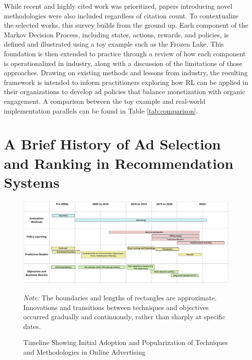 \documentclass[final]{anthology-ch}         %
\begin{document}
While recent and highly cited work was prioritized, papers introducing novel methodologies were also included regardless of citation count. To contextualize the selected works, this survey builds from the ground up. Each component of the Markov Decision Process, including states, actions, rewards, and policies, is defined and illustrated using a toy example such as the Frozen Lake. This foundation is then extended to practice through a review of how each component is operationalized in industry, along with a discussion of the limitations of those approaches. Drawing on existing methods and lessons from industry, the resulting framework is intended to inform practitioners exploring how RL can be applied in their organizations to develop ad policies that balance monetization with organic engagement. A comparison between the toy example and real-world implementation parallels can be found in Table \ref{tab:comparison}.



\section{A Brief History of Ad Selection and Ranking in Recommendation Systems}

\begin{figure}[ht]
    \centering
    \includegraphics[width=\textwidth]{history_timeline_figure.png}
    \caption{Timeline Showing Initial Adoption and Popularization of Techniques and Methodologies in Online Advertising}
    \label{fig:ad_timeline}
    \vspace{0.2cm} %
    \begin{flushleft}
        \footnotesize{\textit{Note:} The boundaries and lengths of rectangles are approximate. Innovations and transitions between techniques and objectives occurred gradually and continuously, rather than sharply at specific dates.}
    \end{flushleft}
\end{figure}
\end{document}
